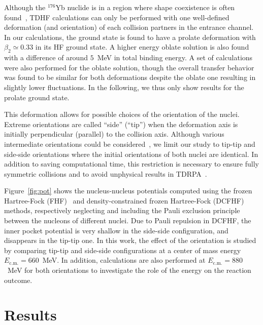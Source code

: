 \documentclass[reprint,aps,prc,twocolumn,superscriptaddress,floatfix,10pt]{revtex4-2}
\begin{document}
Although the $^{176}$Yb nuclide is in a region where shape coexistence is often found~\cite{fu2018,nomura2011,robledo2009,sarriguren2008,xu2011}, TDHF calculations can only be performed with one well-defined deformation (and orientation) of each collision partners in the entrance channel. 
In our calculations, the ground state is found to have a prolate deformation with $\beta_2\simeq 0.33$ in its HF ground state.
A higher energy oblate solution is also found with a difference of around $5$~MeV in total binding energy.
A set of calculations were also performed for the oblate solution, though the overall transfer behavior was found to be similar for both deformations despite the oblate one resulting in slightly lower fluctuations.
In the following, we thus only show results for the prolate ground state. 

This deformation allows for possible choices of the orientation of the nuclei. 
Extreme orientations are called ``side'' (``tip'') when the deformation axis is initially perpendicular (parallel) to the collision axis. 
Although various intermediate orientations could be considered~\cite{godbey2019}, we limit our study to tip-tip and side-side orientations where the initial orientations of both nuclei are identical. 
In addition to saving computational time, this restriction is necessary to ensure fully symmetric collisions and to avoid unphysical results in TDRPA~\cite{williams2018}.

Figure~\ref{fig:pot} shows the nucleus-nucleus potentials computed using the frozen Hartree-Fock (FHF)~\cite{simenel2008,washiyama2008} and density-constrained frozen Hartree-Fock (DCFHF)~\cite{simenel2017} methods, 
respectively neglecting and including the Pauli exclusion principle between the nucleons of different nuclei.
Due to Pauli repulsion in DCFHF, the inner pocket potential is very shallow in the side-side configuration, and disappears in the tip-tip one. 
In this work, the effect of the orientation is studied by comparing tip-tip and side-side configurations at a center of mass energy 
$E_\mathrm{c.m.}=660$~MeV. 
In addition, calculations are also performed at $E_\mathrm{c.m.}=880$~MeV for both orientations to investigate the role of the energy on the reaction outcome. 





\section{Results}\label{sec:results}
\end{document}
